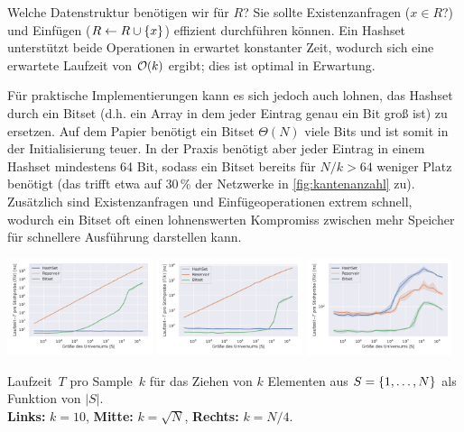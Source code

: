 Welche Datenstruktur benötigen wir für $R$? Sie sollte Existenzanfragen ($x \in R$?) und Einfügen ($R \gets R \cup \left\{x\right\}$) effizient durchführen können.
Ein Hashset unterstützt beide Operationen in erwartet konstanter Zeit, wodurch sich eine erwartete Laufzeit von $\mathcal{O}\!\left(k\right)$ ergibt; dies ist optimal in Erwartung.

Für praktische Implementierungen kann es sich jedoch auch lohnen, das Hashset durch ein Bitset (d.h. ein Array in dem jeder Eintrag genau ein Bit groß ist) zu ersetzen.
Auf dem Papier benötigt ein Bitset $\Theta(N)$ viele Bits und ist somit in der Initialisierung teuer.
In der Praxis benötigt aber jeder Eintrag in einem Hashset mindestens 64 Bit, sodass ein Bitset bereits für $N / k > 64$ weniger Platz benötigt (das trifft etwa auf 30\,\% der Netzwerke in \cref{fig:kantenanzahl} zu).
Zusätzlich sind Existenzanfragen und Einfügeoperationen extrem schnell, wodurch ein Bitset oft einen lohnenswerten Kompromiss zwischen mehr Speicher für schnellere Ausführung darstellen kann.

\begin{widefigure}
    \includegraphics[width=0.32\textwidth]{data/gnm_scale0.pdf}\hfill
    \includegraphics[width=0.32\textwidth]{data/gnm_scale1.pdf}\hfill
    \includegraphics[width=0.32\textwidth]{data/gnm_scale2.pdf}

    \caption{
        Laufzeit~$T$ pro Sample~$k$ für das Ziehen von $k$ Elementen aus $S = \left\{1, \ldots, N\right\}$ als Funktion von $|S|$.\\
        \textbf{Links:} $k=10$, \textbf{Mitte: } $k = \sqrt{N}$, \textbf{Rechts: } $k = N / 4$.
    }
    \label{fig:benchmark_gnm_scale}
\end{widefigure}

